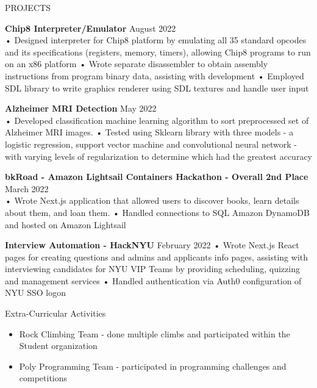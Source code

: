 \documentclass{resume} %
\begin{document}
\begin{rSection}{PROJECTS}

\textbf{\bf Chip8 Interpreter/Emulator } \hfill August 2022 \\
• Designed interpreter for Chip8 platform by emulating all 35 standard opcodes and its specifications (registers, memory, timers), allowing Chip8 programs to run on an x86 platform \newline
• Wrote separate disassembler to obtain assembly instructions from program binary data, assisting with development  \newline
• Employed SDL library to write graphics renderer using SDL textures and handle user input \smallskip

\textbf{\bf Alzheimer MRI Detection } \hfill May 2022 \\
• Developed classification machine learning algorithm to sort preprocessed set of Alzheimer MRI images. 
\newline
• Tested using Sklearn library with three models - a logistic regression, support vector machine and convolutional neural network - with varying levels of regularization to determine which had the greatest accuracy 

\textbf{\bf bkRoad - Amazon Lightsail Containers Hackathon - Overall 2nd Place } \hfill March 2022 \\
• Wrote Next.js application that allowed users to discover books, learn details about them, and loan them. \newline
• Handled connections to SQL Amazon DynamoDB and hosted on Amazon Lightsail

\textbf{\bf Interview Automation - HackNYU} \hfill February 2022 \newline
• Wrote Next.js React pages for creating questions and admins and  applicants info pages, assisting with interviewing candidates for NYU VIP Teams by providing scheduling, quizzing and management services\newline
• Handled authentication via Auth0 configuration of NYU SSO logon \smallskip

\end{rSection} 

\begin{rSection}{Extra-Curricular Activities} 
\begin{itemize} %
    \item   Rock Climbing Team - done multiple climbs and participated within the Student organization
    \item 	Poly Programming Team - participated in programming challenges and competitions

\end{itemize}

\end{rSection}
\end{document}
